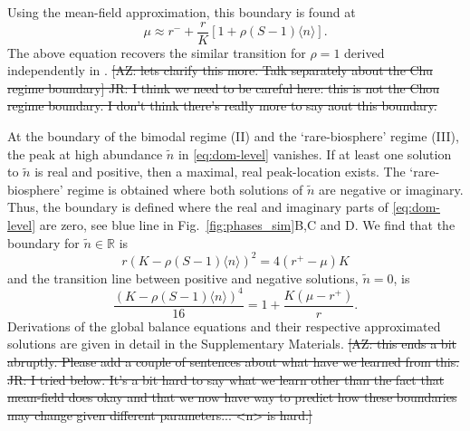 \documentclass[9pt,twocolumn,twoside,lineno]{pnas-new}
\begin{document}
Using the mean-field approximation, this boundary is found at
\begin{equation}
    \label{eq:boundary-I}
    \mu \approx r^- +\frac{r}{K}[1+\rho(S-1)\langle n \rangle ].
\end{equation}
The above equation recovers the similar transition for $\rho=1$ derived independently in \cite{xu2018immigration}. 
\st{[AZ: lets clarify this more. Talk separately about the Chu regime boundary] JR: I think we need to be careful here: this is not the Chou regime boundary. I don't think there's really more to say aout this boundary.}

At the boundary of the bimodal regime (II) and the `rare-biosphere' regime (III), the peak at high abundance $\tilde{n}$ in \eqref{eq:dom-level} vanishes. %
If at least one solution to $\tilde{n}$ is real and positive, then a maximal, real peak-location exists. 
The `rare-biosphere' regime is obtained where both solutions of $\tilde{n}$ are negative or imaginary.  
Thus, the boundary is defined where the real and imaginary parts of \eqref{eq:dom-level} are zero, see blue line in Fig.~\ref{fig:phases_sim}B,C and D.
We find that the boundary for $\tilde{n}\in \mathbb R$ is
\begin{equation}
\label{eq:boundary-I}
r(K-\rho (S-1) \langle n \rangle )^2=4(r^+-\mu){K}
\end{equation}
and the transition line between positive and negative solutions, $\tilde{n}=0$, is
\begin{equation}
    \frac{(K- \rho (S-1) \langle n \rangle )^4}{16}=1+ \frac{K(\mu-r^+)}{r}.
\end{equation}
Derivations of the global balance equations and their respective approximated solutions are given in detail in the Supplementary Materials. 
\st{[AZ: this ends a bit abruptly. Please add a couple of sentences about what have we learned from this. JR: I tried below. It's a bit hard to say what we learn other than the fact that mean-field does okay and that we now have way to predict how these boundaries may change given different parameters... <n> is hard.]}
\end{document}
